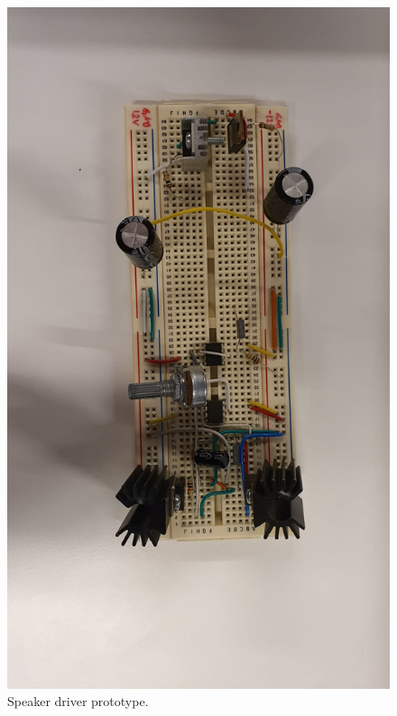 \documentclass[a4paper,10pt]{IEEEtran}
\begin{document}
\begin{figure}[htbp!]
    \centering
    \includegraphics[width = 1\linewidth]{speaker.jpeg}
    \caption{Speaker driver prototype.}
    \label{speaker_breadboard}
\end{figure} 
\end{document}
